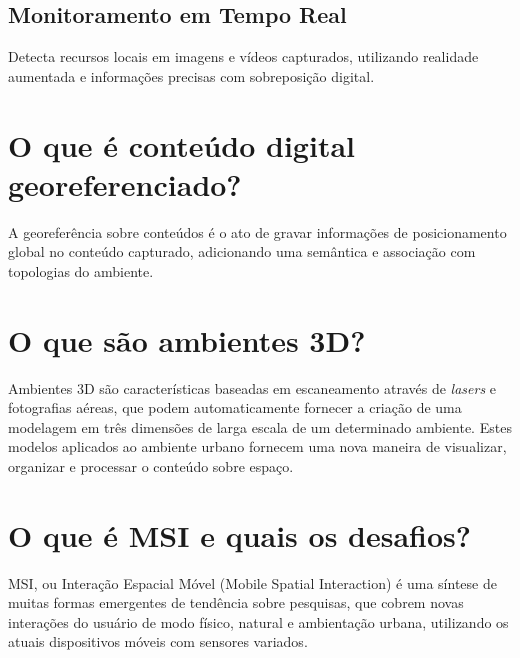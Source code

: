 \documentclass{article}
\begin{document}
\subsection{Monitoramento em Tempo Real}

Detecta recursos locais em imagens e vídeos capturados, utilizando realidade
aumentada e informações precisas com sobreposição digital.

\section{O que é conteúdo digital georeferenciado?}

A georeferência sobre conteúdos é o ato de gravar informações de posicionamento
global no conteúdo capturado, adicionando uma semântica e associação com
topologias do ambiente.

\section{O que são ambientes 3D?}

Ambientes 3D são características baseadas em escaneamento através de
\emph{lasers} e fotografias aéreas, que podem automaticamente fornecer a criação
de uma modelagem em três dimensões de larga escala de um determinado ambiente.
Estes modelos aplicados ao ambiente urbano fornecem uma nova maneira de
visualizar, organizar e processar o conteúdo sobre espaço.

\section{O que é MSI e quais os desafios?}

MSI, ou Interação Espacial Móvel (Mobile Spatial Interaction) é uma síntese de
muitas formas emergentes de tendência sobre pesquisas, que cobrem novas
interações do usuário de modo físico, natural e ambientação urbana, utilizando
os atuais dispositivos móveis com sensores variados.
\end{document}
